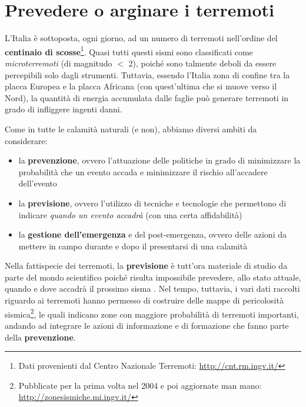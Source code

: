 \documentclass[a4paper,10pt]{memoir}
\begin{document}
\clearpage

\section{Prevedere o arginare i terremoti}

L'Italia è sottoposta, ogni giorno, ad un numero di terremoti nell'ordine del \textbf{centinaio di scosse}\footnote{Dati provenienti dal Centro Nazionale Terremoti: \url{http://cnt.rm.ingv.it/}}. Quasi tutti questi sismi sono classificati come \textit{microterremoti} (di magnitudo $<$ 2), poiché sono talmente deboli da essere percepibili solo dagli strumenti. Tuttavia, essendo l'Italia zona di confine tra la placca Europea e la placca Africana (con quest'ultima che si muove verso il Nord), la quantità di energia accumulata dalle faglie può generare terremoti in grado di infliggere ingenti danni.

Come in tutte le calamità naturali (e non), abbiamo diversi ambiti da considerare:
\begin{itemize}
\item la \textbf{prevenzione}, ovvero l'attuazione delle politiche in grado di minimizzare la probabilità che un evento accada e minimizzare il rischio all'accadere dell'evento
\item la \textbf{previsione}, ovvero l'utilizzo di tecniche e tecnologie che permettono di indicare \textit{quando un evento accadrà} (con una certa affidabilità)
\item la \textbf{gestione dell'emergenza} e del post-emergenza, ovvero delle azioni da mettere in campo durante e dopo il presentarsi di una calamità
\end{itemize}

Nella fattispecie dei terremoti, la \textbf{previsione} è tutt'ora materiale di studio da parte del mondo scientifico poiché risulta impossibile prevedere, allo stato attuale, quando e dove accadrà il prossimo sisma \cite{eqpred} \cite{alessamato}. Nel tempo, tuttavia, i vari dati raccolti riguardo ai terremoti hanno permesso di costruire delle mappe di pericolosità sismica\footnote{Pubblicate per la prima volta nel 2004 e poi aggiornate man mano: \url{http://zonesismiche.mi.ingv.it/}}, le quali indicano zone con maggiore probabilità di terremoti importanti, andando ad integrare le azioni di informazione e di formazione che fanno parte della \textbf{prevenzione}.
\end{document}
